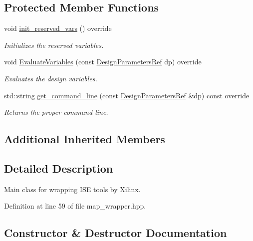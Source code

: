 \subsection*{Protected Member Functions}
\begin{DoxyCompactItemize}
\item 
void \hyperlink{classmap__wrapper_a206084d1b97e49db459560b12e6175df}{init\+\_\+reserved\+\_\+vars} () override
\begin{DoxyCompactList}\small\item\em Initializes the reserved variables. \end{DoxyCompactList}\item 
void \hyperlink{classmap__wrapper_a29c46af244f668b538b47e01ac870d01}{Evaluate\+Variables} (const \hyperlink{DesignParameters_8hpp_ae36bb1c4c9150d0eeecfe1f96f42d157}{Design\+Parameters\+Ref} dp) override
\begin{DoxyCompactList}\small\item\em Evaluates the design variables. \end{DoxyCompactList}\item 
std\+::string \hyperlink{classmap__wrapper_ac788d77f3b80833d49e2dbce39038a1a}{get\+\_\+command\+\_\+line} (const \hyperlink{DesignParameters_8hpp_ae36bb1c4c9150d0eeecfe1f96f42d157}{Design\+Parameters\+Ref} \&dp) const override
\begin{DoxyCompactList}\small\item\em Returns the proper command line. \end{DoxyCompactList}\end{DoxyCompactItemize}
\subsection*{Additional Inherited Members}


\subsection{Detailed Description}
Main class for wrapping I\+SE tools by Xilinx. 

Definition at line 59 of file map\+\_\+wrapper.\+hpp.



\subsection{Constructor \& Destructor Documentation}
\mbox{\label{classmap__wrapper_a6668af09ee3313be9012e8ea4f628141}} 
